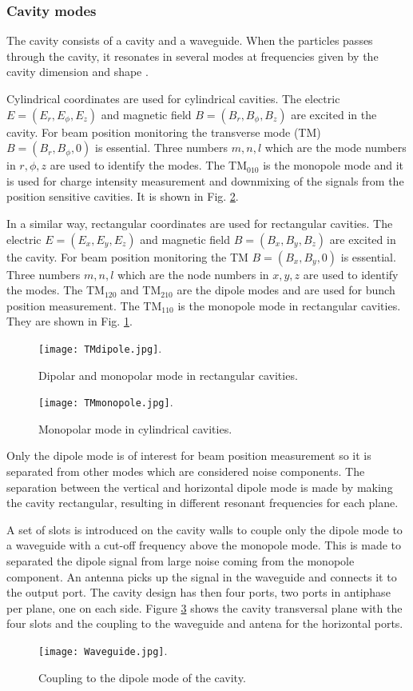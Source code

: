 \subsubsection{Cavity modes}
The cavity consists of a cavity and a waveguide. When the particles passes through the cavity, it resonates in several modes at frequencies given by the cavity dimension and shape \cite{PhysRevSTAB.15.042801}.\par 
Cylindrical coordinates are used for cylindrical cavities. The electric $E=(E_r,E_\phi,E_z)$ and magnetic field $B=(B_r,B_\phi,B_z)$ are excited in the cavity. For beam position monitoring the transverse mode (TM) $B=(B_r,B_\phi,0)$ is essential. Three numbers $m,n,l$ which are the mode numbers in $r,\phi,z$ are used to identify the modes. The TM$_{010}$ is the monopole mode and it is used for charge intensity measurement and downmixing of the signals from the position sensitive cavities. It is shown in Fig. \ref{f:monopole}.\par
In a similar way, rectangular coordinates are used for rectangular cavities. The electric $E=(E_x,E_y,E_z)$ and magnetic field $B=(B_x,B_y,B_z)$ are excited in the cavity. For beam position monitoring the TM $B=(B_x,B_y,0)$ is essential. Three numbers $m,n,l$ which are the node numbers in $x,y,z$ are used to identify the modes. The TM$_{120}$ and TM$_{210}$ are the dipole modes and are used for bunch position measurement. The TM$_{110}$ is the monopole mode in rectangular cavities. They are shown in Fig. \ref{f:dipole}.\par
\begin{figure}[htb]
\centering
\texttt{[image: TMdipole.jpg]}.\caption{Dipolar and monopolar mode in rectangular cavities.}\label{f:dipole}
\end{figure}
\begin{figure}[htb]
\centering
\texttt{[image: TMmonopole.jpg]}.\caption{Monopolar mode in cylindrical cavities.}\label{f:monopole}
\end{figure}
Only the dipole mode is of interest for beam position measurement so it is separated from other modes which are considered noise components. The separation between the vertical and horizontal dipole mode is made by making the cavity rectangular, resulting in different resonant frequencies for each plane.\par
A set of slots is introduced on the cavity walls to couple only the dipole mode to a waveguide with a cut-off frequency above the monopole mode. This is made to separated the dipole signal from large noise coming from the monopole component. An antenna picks up the signal in the waveguide and connects it to the output port. The cavity design has then four ports, two ports in antiphase per plane, one on each side. Figure \ref{f:waveguide} shows the cavity transversal plane with the four slots and the coupling to the waveguide and antena for the horizontal ports.\par
\begin{figure}[htb]
\centering
\texttt{[image: Waveguide.jpg]}.\caption{Coupling to the dipole mode of the cavity.}\label{f:waveguide}
\end{figure}
